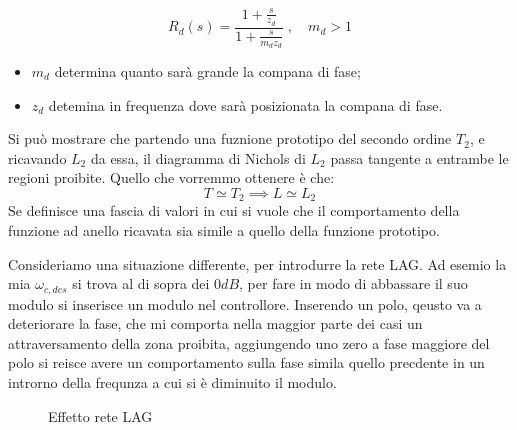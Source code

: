 \documentclass[12pt]{article}
\begin{document}
\[ R_d(s) = \frac{\displaystyle 1 + \frac{s}{z_d} }{\displaystyle 1 + \frac{s}{m_dz_d} }\;,\quad m_d > 1  \]
\begin{itemize}
    \item $m_d$ determina quanto sar\`a grande la compana di fase;
    \item $z_d$ detemina in frequenza dove sar\`a posizionata la compana di fase.
\end{itemize}

Si pu\`o mostrare che partendo una fuznione prototipo del secondo ordine $T_2$, e ricavando $L_2$ da essa, il diagramma di Nichols di $L_2$ passa tangente a entrambe le regioni proibite. Quello che vorremmo ottenere \`e che:
\[ T \simeq T_2 \implies L \simeq L_2 \]
Se definisce una fascia di valori in cui si vuole che il comportamento della funzione ad anello ricavata sia simile a quello della funzione prototipo.



Consideriamo una situazione differente, per introdurre la rete LAG. Ad esemio la mia $\omega _{c,des}$ si trova al di sopra dei $0dB$, per fare in modo di abbassare il suo modulo si inserisce un modulo nel controllore. Inserendo un polo, qeusto va a deteriorare la fase, che mi comporta nella maggior parte dei casi un attraversamento della zona proibita, aggiungendo uno zero a fase maggiore del polo si reisce avere un comportamento sulla fase simila quello precdente in un introrno della frequnza a cui si \`e diminuito il modulo.
\begin{figure}[H]
    \centering
    \hfill%
    \caption{Effetto rete LAG}
\end{figure}
\end{document}
